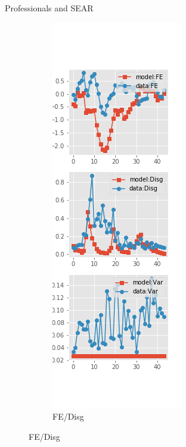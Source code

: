 \documentclass{beamer}
\begin{document}
\begin{frame}{Professionals and SEAR}
\begin{figure}[ht]
\begin{subfigure}[b]{0.2\textwidth}
		\end{subfigure}
		\hfill
		\begin{subfigure}[b]{0.2\textwidth}
			\caption{FE/Disg}
			\includegraphics[width=\textwidth, height = 0.8\textheight]{figuresDraft/spf_se_est_diag2.png}

\end{subfigure}
\end{figure}
\end{frame}
\end{document}
